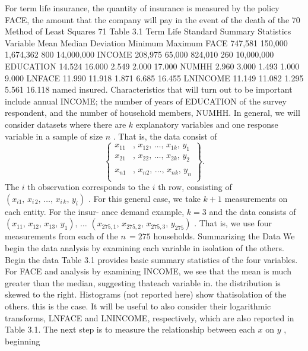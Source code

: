 \documentclass[11pt]{article}
\begin{document}
For term life insurance, the quantity of insurance is measured by the policy
FACE, the amount that the company will pay in the event of the death of the
70
 Method of Least Squares 71
 Table 3.1 Term Life
Standard Summary Statistics
Variable Mean Median Deviation Minimum Maximum
FACE 747,581 150,000 1,674,362 800 14,000,000
INCOME 208,975 65,000 824,010 260 10,000,000
EDUCATION 14.524 16.000 2.549 2.000 17.000
NUMHH 2.960 3.000 1.493 1.000 9.000
LNFACE 11.990 11.918 1.871 6.685 16.455
LNINCOME 11.149 11.082 1.295 5.561 16.118
named insured. Characteristics that will turn out to be important include annual
INCOME; the number of years of EDUCATION of the survey respondent, and
 the number of household members, NUMHH.
In general, we will consider datasets where there are \(k\) explanatory variables
 and one response variable in a sample of size \(n\) . That is, the data consist of
\[
\left\{\begin{aligned} {x_{1 1}} & {{} , \, x_{1 2} , \, \ldots, \, x_{1 k} , \, y_{1}} \\ {x_{2 1}} & {{} , \, x_{2 2} , \, \ldots, \, x_{2 k} , \, y_{2}} \\ {} & {{}} \\ {x_{n 1}} & {{} , \, x_{n 2} , \, \ldots, \, x_{n k} , \, y_{n}} \\ \end{aligned} \right\} .
\]
The \(i\) th observation corresponds to the \(i\) th row, consisting of \(\left( x_{i 1} , \, x_{i \, 2} , \, \ldots, \, x_{i \, k} , \, y_{i} \right)\) .
For this general case, we take \(k+1\) measurements on each entity. For the insur-
ance demand example, \(k=3\) and the data consists of \(( x_{1 1} , \, x_{1 2} , \, x_{1 3} , \, y_{1} ) , \, \ldots\)
\(\left( x_{2 7 5 , 1} , \, x_{2 7 5 , 2} , \, x_{2 7 5 , 3} , \, y_{2 7 5} \right)\) . That is, we use four measurements from each of the
\(n \,=2 7 5\) households.
 Summarizing the Data
We begin the data analysis by examining each variable in isolation of the others. Begin the data
Table 3.1 provides basic summary statistics of the four variables. For FACE and analysis by examining
INCOME, we see that the mean is much greater than the median, suggesting thateach variable in.
the distribution is skewed to the right. Histograms (not reported here) show thatisolation of the others.
this is the case. It will be useful to also consider their logarithmic transforms,
LNFACE and LNINCOME, respectively, which are also reported in Table 3.1.
 The next step is to measure the relationship between each \(x\) on \(y\) , beginning
\end{document}
